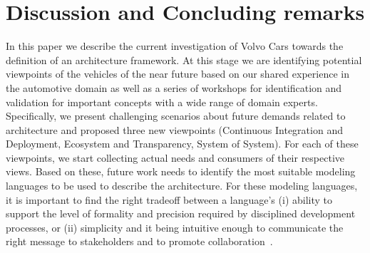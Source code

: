 \section{Discussion and Concluding remarks}\label{sec:conclusion}

In this paper we describe the current investigation of Volvo Cars towards the definition of an architecture framework.
At this stage we are identifying potential viewpoints of the vehicles of the near future based on our shared experience in the automotive domain as well as a series of workshops for identification and validation for important concepts with a wide range of domain experts. 
Specifically, we present challenging scenarios about future demands related to architecture and proposed three new viewpoints (Continuous Integration and Deployment, Ecosystem and Transparency, System of System).
For each of these viewpoints, we start collecting actual needs and consumers of their respective views. 
Based on these, future work needs to identify the most suitable modeling languages to be used to describe the architecture. 
For these modeling languages, it is important to find the right tradeoff between a language's
(i) ability to support the level of formality and precision required by disciplined development processes, or
(ii) simplicity and it being intuitive enough to communicate the right message to stakeholders and to promote collaboration~\cite{IEEESoftwarePatrizio,whatindustrywants}.

